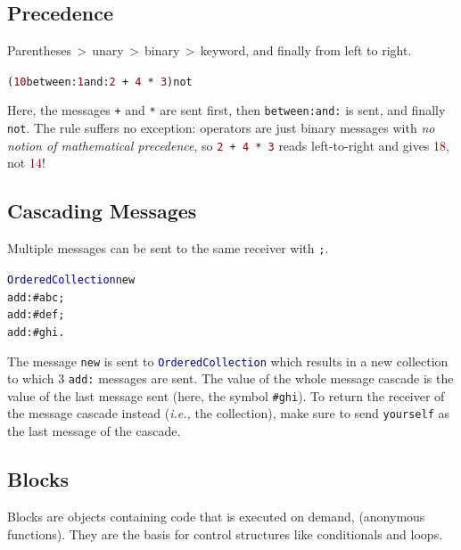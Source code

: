 \documentclass[notumble]{leaflet}
\makeatletter
\newcommand{\ie}{\emph{i.e.,}\xspace}
\newenvironment{displaycode}{%
     \par
     \hspace{1.5em}\begin{minipage}{\linewidth}
       \begin{alltt}\small}{
       \end{alltt}
     \end{minipage}
     \par}
\newcommand{\code}[1]{\foreignlanguage{english}{\texttt{#1}}}
\makeatother
\begin{document}
\subsection{Precedence}

Parentheses\,$>$\,unary\,$>$\,binary\,$>$\,keyword, and finally from
left to right.

\begin{displaycode}
(\textcolor{darkRed}{10} between: \textcolor{darkRed}{1} and: \textcolor{darkRed}{2}\,+\,\textcolor{darkRed}{4}\,*\,\textcolor{darkRed}{3}) not
\end{displaycode}

Here, the messages \code{+} and \code{*} are sent first, then \code{between:and:} is sent, and finally \code{not}.
The rule suffers no exception: operators are just binary messages with \emph{no notion of mathematical precedence}, so
\code{\textcolor{darkRed}{2}\,+\,\textcolor{darkRed}{4}\,*\,\textcolor{darkRed}{3}} reads left-to-right and gives \textcolor{darkRed}{18}, not \textcolor{darkRed}{14}!

\clearpage

\subsection{Cascading Messages}

Multiple messages can be sent to the same receiver with \code{;}.

\begin{displaycode}
\textcolor{darkBlue}{OrderedCollection} new
  add: \textcolor{string}{#abc};
  add: \textcolor{string}{#def};
  add: \textcolor{string}{#ghi}.
\end{displaycode}

The message \code{new} is sent to \code{\textcolor{darkBlue}{OrderedCollection}} which
results in a new collection to which 3
\code{add:} messages are sent. The value of the whole message cascade
is the value of the last message sent (here, the symbol
\textcolor{string}{\code{\#ghi}}). To return the receiver of the
message cascade instead (\ie the collection), make sure to send
\code{yourself} as the last message of the cascade.

\subsection{Blocks}

Blocks are objects containing code that is executed on demand,
(anonymous functions). They are the basis for control structures like
conditionals and loops.
\end{document}
